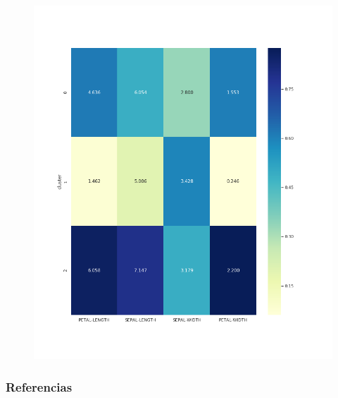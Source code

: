 \documentclass[spanish]{beamer}
\begin{document}
\begin{frame}
\begin{figure}[h]
\centering
\includegraphics[scale=0.29]{dani/heatmapMeanShiftIRIS.png}
\end{figure}
\end{frame}

\begin{frame}
  \frametitle{Referencias}
        
        
\end{frame}
\end{document}
